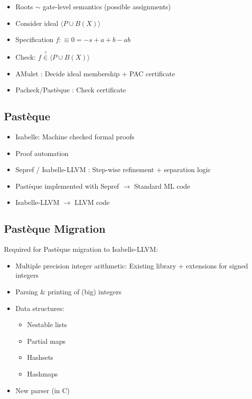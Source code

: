 \documentclass[aspectratio=169, 11pt]{beamer}
\newcommand{\spnote}[1]{\pdfcomment[icon=Note,color=yellow,opacity=1]{#1}}
\newcommand{\spnote}[1]{}
\begin{document}
\begin{frame}
    \begin{itemize}
        \item Roots $\sim$ gate-level semantics (possible assignments)
        \item Consider ideal $\langle P \cup B(X) \rangle$
        \item Specification $f :\equiv 0 = -s + a + b -ab$
        \item Check: $f \mathrel{\overset{?}{\in}} \langle P \cup B(X) \rangle$
        \item AMulet \cite{amulet2}: Decide ideal membership + PAC certificate \cite{pac-2018, pac-2024}
        \item Pacheck/Pastèque \cite{pasteque}: Check certificate
    \end{itemize}
\end{frame}

\subsection{Pastèque}

\begin{frame}
    \begin{itemize}
        \item Isabelle: Machine checked formal proofs
        \item Proof automation
        \item Sepref \cite{sepref} / Isabelle-LLVM \cite{isabelle-llvm}: Step-wise refinement + separation logic
        \item Pastèque implemented with Sepref $\rightarrow$ Standard ML code
        \item Isabelle-LLVM $\rightarrow$ LLVM code
    \end{itemize}
    \spnote{
        End: 9:00
    }
\end{frame}

\subsection{Pastèque Migration}
\begin{frame}
Required for Pastèque migration to Isabelle-LLVM:
    \begin{itemize}
        \item Multiple precision integer arithmetic: Existing library \cite{spinei_isabelle_big_integer} + extensions for signed integers
        \item Parsing \& printing of (big) integers \item Data structures:
        \begin{itemize}
            \item Nestable lists
            \item Partial maps
            \item Hashsets
            \item Hashmaps
        \end{itemize}
        \item New parser (in C)
    \end{itemize}
    \spnote{
        End: 12:00
    }
\end{frame}
\end{document}
